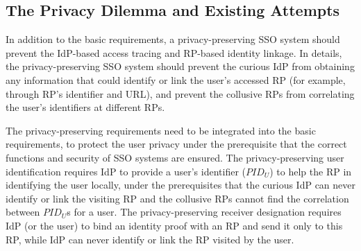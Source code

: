 \subsection{The Privacy Dilemma and Existing Attempts}
\label{subsec:challenges}

In addition to the basic requirements, a privacy-preserving SSO system should prevent the IdP-based access tracing %
and RP-based identity linkage.
In details, the privacy-preserving SSO system should prevent the curious IdP from obtaining any information that could identify or link the user's accessed RP (for example, through RP's identifier and URL),
and prevent  the collusive RPs from correlating the user's identifiers at different RPs. %

The privacy-preserving requirements need to be integrated into the basic requirements, to protect the user privacy under the prerequisite that the correct functions and security of SSO systems are ensured.
The privacy-preserving user identification requires IdP to provide a user's identifier ($PID_U$) to help the RP in identifying the user locally,
 under the prerequisites that the curious IdP can never identify or link the visiting RP and the collusive RPs cannot find the correlation between $PID_U$s for a user.
The privacy-preserving receiver designation requires IdP (or the user) to bind an identity proof with an RP and send it only to this RP,
 while IdP can never identify or link the RP visited by the user.

